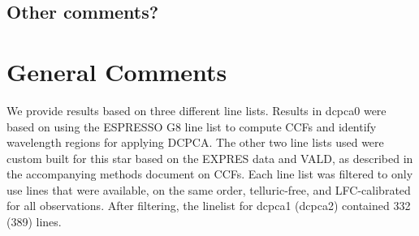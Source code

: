 \documentclass[12pt]{article}
\begin{document}
\subsection{Other comments?}


\section{General Comments}

We provide results based on three different line lists.
Results in dcpca0 were based on using the ESPRESSO G8 line list to compute CCFs and identify wavelength regions for applying DCPCA.
The other two line lists used were custom built for this star based on the EXPRES data and VALD, as described in the accompanying methods document on CCFs.
Each line list was filtered to only use lines that were available, on the same order, telluric-free, and LFC-calibrated for all observations.
After filtering, the linelist for dcpca1 (dcpca2) contained 332 (389) lines.
\end{document}
